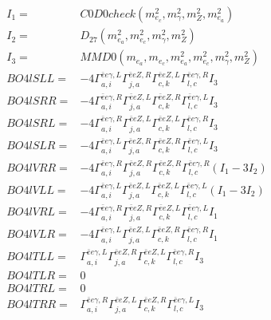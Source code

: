 \documentclass[A4,landscape]{article}
\begin{document}
\begin{align} 
I_1 = & C0D0check(m^2_{e_{{c}}}, m^2_{\gamma}, m^2_{Z}, m^2_{e_{{a}}}) \\ 
I_2 = & D_{27}(m^2_{e_{{a}}}, m^2_{e_{{c}}}, m^2_{\gamma}, m^2_{Z}) \\ 
I_3 = & MMD0(m_{e_{{a}}}, m_{e_{{c}}}, m^2_{e_{{a}}}, m^2_{e_{{c}}}, m^2_{\gamma}, m^2_{Z}) \\ 
  BO4lSLL= & -4  \Gamma^{\bar{e}e \gamma ,L}_{a, i} \Gamma^{\bar{e}e Z ,R}_{j, a} \Gamma^{\bar{e}e Z ,L}_{c, k} \Gamma^{\bar{e}e \gamma ,R}_{l, c} I_3 \\ 
  BO4lSRR= & -4  \Gamma^{\bar{e}e \gamma ,R}_{a, i} \Gamma^{\bar{e}e Z ,L}_{j, a} \Gamma^{\bar{e}e Z ,R}_{c, k} \Gamma^{\bar{e}e \gamma ,L}_{l, c} I_3 \\ 
  BO4lSRL= & -4  \Gamma^{\bar{e}e \gamma ,R}_{a, i} \Gamma^{\bar{e}e Z ,L}_{j, a} \Gamma^{\bar{e}e Z ,L}_{c, k} \Gamma^{\bar{e}e \gamma ,R}_{l, c} I_3 \\ 
  BO4lSLR= & -4  \Gamma^{\bar{e}e \gamma ,L}_{a, i} \Gamma^{\bar{e}e Z ,R}_{j, a} \Gamma^{\bar{e}e Z ,R}_{c, k} \Gamma^{\bar{e}e \gamma ,L}_{l, c} I_3 \\ 
  BO4lVRR= & -4  \Gamma^{\bar{e}e \gamma ,R}_{a, i} \Gamma^{\bar{e}e Z ,R}_{j, a} \Gamma^{\bar{e}e Z ,R}_{c, k} \Gamma^{\bar{e}e \gamma ,R}_{l, c} (I_1 - 3 I_2) \\ 
  BO4lVLL= & -4  \Gamma^{\bar{e}e \gamma ,L}_{a, i} \Gamma^{\bar{e}e Z ,L}_{j, a} \Gamma^{\bar{e}e Z ,L}_{c, k} \Gamma^{\bar{e}e \gamma ,L}_{l, c} (I_1 - 3 I_2) \\ 
  BO4lVRL= & -4  \Gamma^{\bar{e}e \gamma ,R}_{a, i} \Gamma^{\bar{e}e Z ,R}_{j, a} \Gamma^{\bar{e}e Z ,L}_{c, k} \Gamma^{\bar{e}e \gamma ,L}_{l, c} I_1 \\ 
  BO4lVLR= & -4  \Gamma^{\bar{e}e \gamma ,L}_{a, i} \Gamma^{\bar{e}e Z ,L}_{j, a} \Gamma^{\bar{e}e Z ,R}_{c, k} \Gamma^{\bar{e}e \gamma ,R}_{l, c} I_1 \\ 
  BO4lTLL= &  \Gamma^{\bar{e}e \gamma ,L}_{a, i} \Gamma^{\bar{e}e Z ,R}_{j, a} \Gamma^{\bar{e}e Z ,L}_{c, k} \Gamma^{\bar{e}e \gamma ,R}_{l, c} I_3 \\ 
  BO4lTLR= & 0 \\ 
  BO4lTRL= & 0 \\ 
  BO4lTRR= &  \Gamma^{\bar{e}e \gamma ,R}_{a, i} \Gamma^{\bar{e}e Z ,L}_{j, a} \Gamma^{\bar{e}e Z ,R}_{c, k} \Gamma^{\bar{e}e \gamma ,L}_{l, c} I_3 \\ 
\end{align} 
\end{document}
